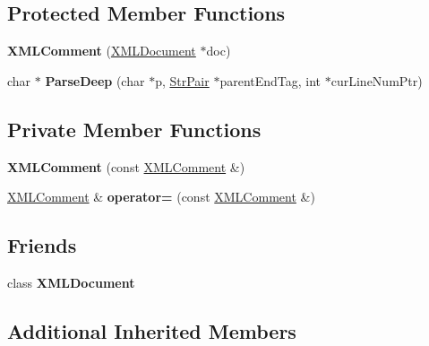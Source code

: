 \subsection*{Protected Member Functions}
\begin{DoxyCompactItemize}
\item 
\mbox{\label{classtinyxml2_1_1XMLComment_ae6463adc3edd93a8e5a9b2b7e99cdf91}} 
{\bfseries X\+M\+L\+Comment} (\mbox{\hyperlink{classtinyxml2_1_1XMLDocument}{X\+M\+L\+Document}} $\ast$doc)
\item 
\mbox{\label{classtinyxml2_1_1XMLComment_ab5da828fe023869b8c5bb69554d41bb1}} 
char $\ast$ {\bfseries Parse\+Deep} (char $\ast$p, \mbox{\hyperlink{classtinyxml2_1_1StrPair}{Str\+Pair}} $\ast$parent\+End\+Tag, int $\ast$cur\+Line\+Num\+Ptr)
\end{DoxyCompactItemize}
\subsection*{Private Member Functions}
\begin{DoxyCompactItemize}
\item 
\mbox{\label{classtinyxml2_1_1XMLComment_aa0a9aae0850ac0e70d3cd20f6cb44447}} 
{\bfseries X\+M\+L\+Comment} (const \mbox{\hyperlink{classtinyxml2_1_1XMLComment}{X\+M\+L\+Comment}} \&)
\item 
\mbox{\label{classtinyxml2_1_1XMLComment_ac8de55f8381d110740772e6bf6f5755a}} 
\mbox{\hyperlink{classtinyxml2_1_1XMLComment}{X\+M\+L\+Comment}} \& {\bfseries operator=} (const \mbox{\hyperlink{classtinyxml2_1_1XMLComment}{X\+M\+L\+Comment}} \&)
\end{DoxyCompactItemize}
\subsection*{Friends}
\begin{DoxyCompactItemize}
\item 
\mbox{\label{classtinyxml2_1_1XMLComment_a4eee3bda60c60a30e4e8cd4ea91c4c6e}} 
class {\bfseries X\+M\+L\+Document}
\end{DoxyCompactItemize}
\subsection*{Additional Inherited Members}


